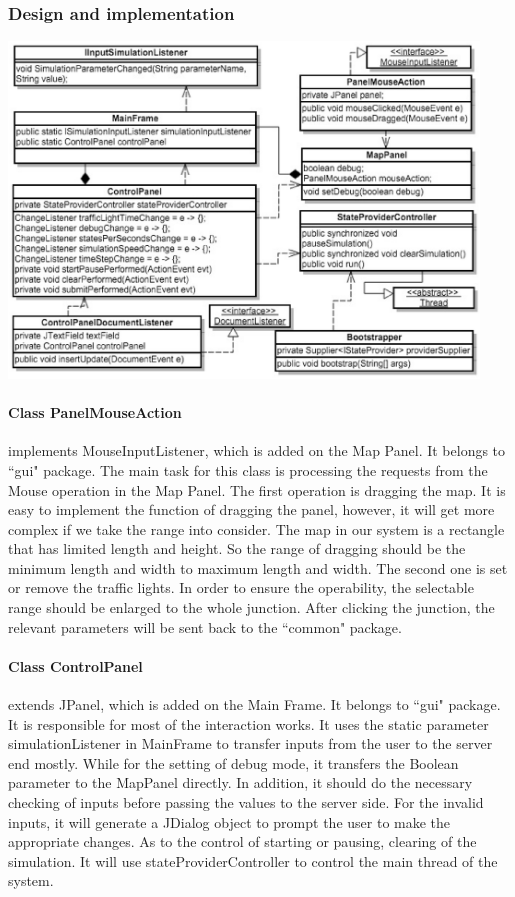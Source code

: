 \documentclass[a4paper,12pt]{article}
\begin{document}
\subsubsection{Design and implementation}
\includegraphics[width=12.5cm]{interactionClassGraph.eps}
\paragraph{Class PanelMouseAction} implements MouseInputListener, which is added on the Map Panel. It belongs to ``gui" package. The main task for this class is processing the requests from the Mouse operation in the Map Panel. The first operation is dragging the map. It is easy to implement the function of dragging the panel, however, it will get more complex if we take the range into consider. The map in our system is a rectangle that has limited length and height. So the range of dragging should be the minimum length and width to maximum length and width. The second one is set or remove the traffic lights. In order to ensure the operability, the selectable range should be enlarged to the whole junction. After clicking the junction, the relevant parameters will be sent back to the ``common" package.
\paragraph{Class ControlPanel} extends JPanel, which is added on the Main Frame. It belongs to ``gui" package. It is responsible for most of the interaction works. It uses the static parameter simulationListener in MainFrame to transfer inputs from the user to the server end mostly. While for the setting of debug mode, it transfers the Boolean parameter to the MapPanel directly. In addition, it should do the necessary checking of inputs before passing the values to the server side. For the invalid inputs, it will generate a JDialog object to prompt the user to make the appropriate changes. As to the control of starting or pausing, clearing of the simulation. It will use stateProviderController to control the main thread of the system.
\end{document}

